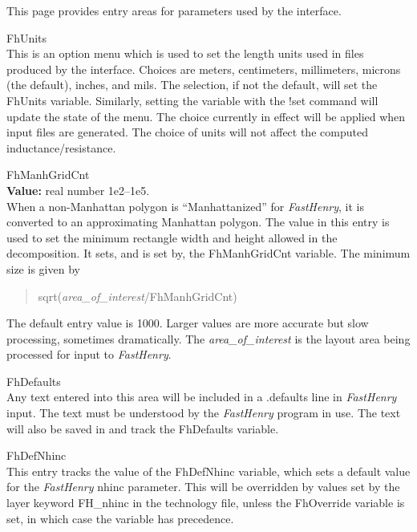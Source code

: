 This page provides entry areas for parameters used by the
interface.

\begin{description}
\item{\cb FhUnits}\\
This is an option menu which is used to set the length units used in
files produced by the interface.  Choices are meters, centimeters,
millimeters, microns (the default), inches, and mils.  The selection,
if not the default, will set the {\et FhUnits} variable.  Similarly,
setting the variable with the {\cb !set} command will update the state
of the menu.  The choice currently in effect will be applied when
input files are generated.  The choice of units will not affect the
computed inductance/resistance.

\item{\cb FhManhGridCnt}\\
{\bf Value:} real number 1e2--1e5.\\
When a non-Manhattan polygon is ``Manhattanized'' for {\it FastHenry},
it is converted to an approximating Manhattan polygon.  The value in
this entry is used to set the minimum rectangle width and height
allowed in the decomposition.  It sets, and is set by, the {\et
FhManhGridCnt} variable.  The minimum size is given by
\begin{quote}
{\vt sqrt(}{\it area\_of\_interest\/}{\vt /FhManhGridCnt)}
\end{quote}
The default entry value is 1000.  Larger values are more accurate
but slow processing, sometimes dramatically.  The {\it
area\_of\_interest} is the layout area being processed for input to
{\it FastHenry}.

\item{\cb FhDefaults}\\
Any text entered into this area will be included in a {\vt
.defaults} line in {\it FastHenry} input.  The text must be
understood by the {\it FastHenry} program in use.  The text
will also be saved in and track the {\et FhDefaults} variable.

\item{\cb FhDefNhinc}\\
This entry tracks the value of the {\et FhDefNhinc} variable,
which sets a default value for the {\it FastHenry} {\vt nhinc}
parameter.  This will be overridden by values set by the layer
keyword {\vt FH\_nhinc} in the technology file, unless the
{\et FhOverride} variable is set, in which case the variable
has precedence.


\end{description}
